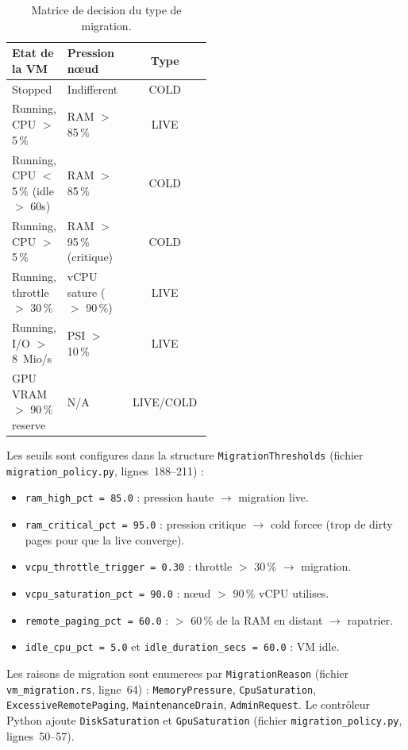 \begin{table}[htbp]
    \centering
    \caption{Matrice de decision du type de migration.}
    \label{tab:migration-matrice}
    \begin{tabular}{p{0.25\linewidth} p{0.25\linewidth} c}
        \toprule
        \textbf{Etat de la VM} & \textbf{Pression n\oe{}ud} & \textbf{Type} \\
        \midrule
        Stopped & Indifferent & COLD \\
        Running, CPU $>$ 5\,\% & RAM $>$ 85\,\% & LIVE \\
        Running, CPU $<$ 5\,\% (idle $>$ 60s) & RAM $>$ 85\,\% & COLD \\
        Running, CPU $>$ 5\,\% & RAM $>$ 95\,\% (critique) & COLD \\
        Running, throttle $>$ 30\,\% & vCPU sature ($>$ 90\,\%) & LIVE \\
        Running, I/O $>$ 8~Mio/s & PSI $>$ 10\,\% & LIVE \\
        GPU VRAM $>$ 90\,\% reserve & N/A & LIVE/COLD \\
        \bottomrule
    \end{tabular}
\end{table}

Les seuils sont configures dans la structure \texttt{MigrationThresholds} (fichier \texttt{migration\_policy.py}, lignes~188--211) :

\begin{itemize}
    \item \texttt{ram\_high\_pct = 85.0} : pression haute $\to$ migration live.
    \item \texttt{ram\_critical\_pct = 95.0} : pression critique $\to$ cold forcee (trop de dirty pages pour que la live converge).
    \item \texttt{vcpu\_throttle\_trigger = 0.30} : throttle $>$ 30\,\% $\to$ migration.
    \item \texttt{vcpu\_saturation\_pct = 90.0} : n\oe{}ud $>$ 90\,\% vCPU utilises.
    \item \texttt{remote\_paging\_pct = 60.0} : $>$ 60\,\% de la RAM en distant $\to$ rapatrier.
    \item \texttt{idle\_cpu\_pct = 5.0} et \texttt{idle\_duration\_secs = 60.0} : VM idle.
\end{itemize}

Les raisons de migration sont enumerees par \texttt{MigrationReason} (fichier \texttt{vm\_migration.rs}, ligne~64) : \texttt{MemoryPressure}, \texttt{CpuSaturation}, \texttt{ExcessiveRemotePaging}, \texttt{MaintenanceDrain}, \texttt{AdminRequest}. Le contr\^oleur Python ajoute \texttt{DiskSaturation} et \texttt{GpuSaturation} (fichier \texttt{migration\_policy.py}, lignes~50--57).

